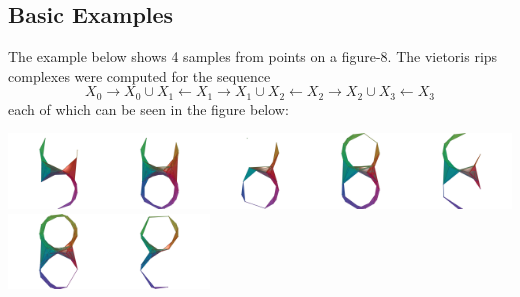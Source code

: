 \documentclass[10pt]{amsart}
\begin{document}
\subsection{Basic Examples}

The example below shows 4 samples from points on a figure-8. The vietoris rips complexes were computed for the sequence
$$X_0 \rightarrow X_0 \cup X_1 \leftarrow X_1 \rightarrow X_1 \cup X_2 \leftarrow X_2 \rightarrow X_2 \cup X_3 \leftarrow X_3$$
each of which can be seen in the figure below:

\vspace{0.5cm}
\hspace{-1.5cm}\includegraphics[height=2cm]{figure-8-vietoris-rips-0.png}\includegraphics[height=2cm]{figure-8-vietoris-rips-01.png}\includegraphics[height=2cm]{figure-8-vietoris-rips-1.png}\includegraphics[height=2cm]{figure-8-vietoris-rips-12.png}\includegraphics[height=2cm]{figure-8-vietoris-rips-2.png}\includegraphics[height=2cm]{figure-8-vietoris-rips-23.png}\includegraphics[height=2cm]{figure-8-vietoris-rips-3.png}
\vspace{0.5cm}
\end{document}
